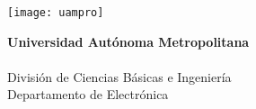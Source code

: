 \documentclass[10pt,letterpaper]{article}
\begin{document}
\begin{flushright}
	{\small
		\begin{minipage}[b]{0.17\linewidth}
			\texttt{[image: uampro]}
		\end{minipage}
		\begin{minipage}[b]{0.3\linewidth}
			\textbf{Universidad Autónoma Metropolitana}\\ %
			\\
			División de Ciencias Básicas e Ingeniería\\ %
			Departamento de Electrónica
		\end{minipage}
	}
\end{flushright}

{\Large {}}\\
{\large {}}
\vspace{0.2cm} 
\end{document}

